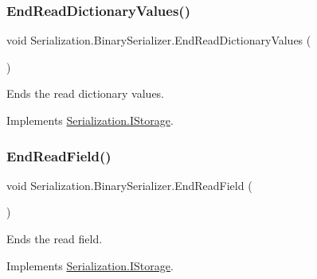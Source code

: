 \subsubsection{\texorpdfstring{End\+Read\+Dictionary\+Values()}{EndReadDictionaryValues()}}
{\footnotesize\ttfamily void Serialization.\+Binary\+Serializer.\+End\+Read\+Dictionary\+Values (\begin{DoxyParamCaption}{ }\end{DoxyParamCaption})\hspace{0.3cm}{\ttfamily [inline]}}



Ends the read dictionary values. 



Implements \hyperlink{interface_serialization_1_1_i_storage_af76c715808ff9cca9b89c995a556ec6b}{Serialization.\+I\+Storage}.

\mbox{\label{class_serialization_1_1_binary_serializer_a0c52bbac20e29e59f6c48868d4729928}} 
\subsubsection{\texorpdfstring{End\+Read\+Field()}{EndReadField()}}
{\footnotesize\ttfamily void Serialization.\+Binary\+Serializer.\+End\+Read\+Field (\begin{DoxyParamCaption}{ }\end{DoxyParamCaption})\hspace{0.3cm}{\ttfamily [inline]}}



Ends the read field. 



Implements \hyperlink{interface_serialization_1_1_i_storage_ad27a910b48b01fcee850465606cd2a6f}{Serialization.\+I\+Storage}.

\mbox{\label{class_serialization_1_1_binary_serializer_a5083f578f8a2aff5fd5163edc802a0d1}} 
